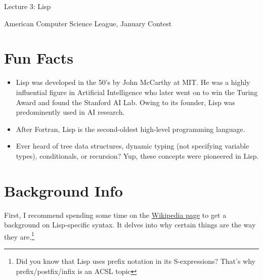 \documentclass[10pt]{article}
\begin{document}
    \noindent
    \begin{center}

        \hrulefill

        \vspace{5pt}

        \vspace{0pt}

        {\Large \hfill  Lecture 3: Lisp\hfill}
        \vspace{10pt}

        {\large \hfill  American Computer Science League, January Contest\hfill}
        \vspace{10pt}


        \vspace{-3pt}
        \hrulefill
    \end{center}

\section{Fun Facts}
\begin{itemize}
    \item Lisp was developed in the 50's by John McCarthy at MIT.
    He was a highly influential figure in Artificial Intelligence who later
    went on to win the Turing Award and found the Stanford AI Lab.
    Owing to its founder, Lisp was predominently used in AI research.
    \item After Fortran, Lisp is the second-oldest high-level programming language.
    \item Ever heard of tree data structures, dynamic typing (not specifying variable types), conditionals, or recursion?
    Yup, these concepts were pioneered in Lisp.
\end{itemize}

\section{Background Info}
First, I recommend spending some time on the
\href{https://en.wikipedia.org/wiki/Lisp_(programming_language)#Syntax_and_semantics}{Wikipedia page} to get a background on Lisp-specific syntax.
It delves into why certain things are the way they are.\footnote{Did
you know that Lisp uses prefix notation in its S-expressions?
That's why prefix/postfix/infix is an ACSL topic}
\end{document}
